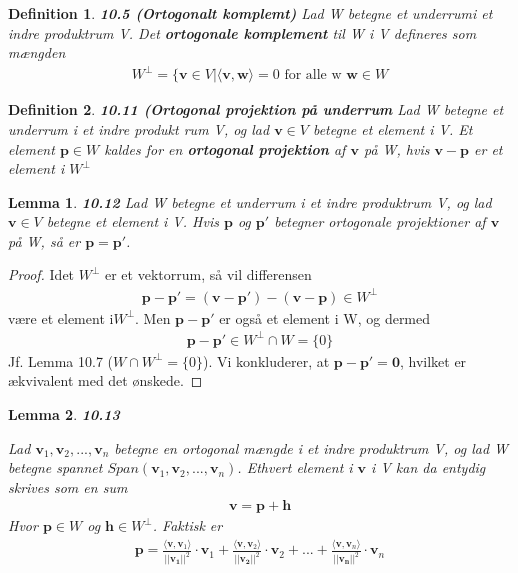 \documentclass[paper=a4, fontsize=11pt]{scrartcl} %
\newtheorem*{lemma}{Lemma}
\newtheorem*{definition}{Definition}
\newenvironment{cstmlemma}[1]{\begin{lemma} {\normalfont\textbf{#1}}}{\end{lemma}}
\newenvironment{cstmdefinition}[1]{\begin{definition} {\normalfont\textbf{#1}}}{\end{definition}}
\begin{document}
		\begin{cstmdefinition}{10.5 (Ortogonalt komplemt)}
			Lad W betegne et underrumi et indre produktrum V. Det \textbf{ortogonale komplement} til W i V defineres som mængden
			\begin{align*}
			W^\bot =\{\mathbf{v}\in V|\langle\mathbf{v},\mathbf{w}\rangle=0 \text{ for alle w } \mathbf{w}\in W
			\end{align*}
			
		\end{cstmdefinition}
		
		\begin{cstmdefinition}{10.11 (Ortogonal projektion på underrum}
			Lad W betegne et underrum i et indre produkt rum V, og lad $\mathbf{v}\in V$ betegne et element i V. Et element $\mathbf{p}\in W$ kaldes for en \textbf{ortogonal projektion} af $\mathbf{v}$ på W, hvis $\mathbf{v}-\mathbf{p}$ er et element i $W^\bot$
			
		\end{cstmdefinition}
		
		\begin{cstmlemma}{10.12}
			Lad W betegne et underrum i et indre produktrum V, og lad $\mathbf{v}\in V$ betegne et element i V. Hvis $\mathbf{p}$ og $\mathbf{p}'$ betegner ortogonale projektioner af $\mathbf{v}$ på W, så er $\mathbf{p}=\mathbf{p}'$.
		\end{cstmlemma}
		
		\begin{proof}
			Idet $W^\bot$ er et vektorrum, så vil differensen
			\begin{align*}
			\mathbf{p}-\mathbf{p}' =(\mathbf{v}-\mathbf{p}')-(\mathbf{v}-\mathbf{p})\in W^\bot
			\end{align*}
			være et element i$W^\bot$. Men $\mathbf{p}-\mathbf{p}'$ er også et element i W, og dermed
			\begin{align*}
			\mathbf{p}-\mathbf{p}'\in W^\bot \cap W=\{0\}
			\end{align*}
			Jf. Lemma 10.7 ($W\cap W^\bot =\{0\}$). Vi konkluderer, at $\mathbf{p}-\mathbf{p}'=\mathbf{0}$, hvilket er ækvivalent med det ønskede.
		\end{proof}
		
		\begin{cstmlemma}{10.13}
			
			Lad $\mathbf{v}_1,\mathbf{v}_2,...,\mathbf{v}_n$ betegne en ortogonal mængde i et indre produktrum V, og lad W betegne spannet $Span(\mathbf{v}_1,\mathbf{v}_2,...,\mathbf{v}_n)$. Ethvert element i $\mathbf{v}$ i V kan da entydig skrives som en sum
			\begin{align*}
			\mathbf{v}=\mathbf{p}+\mathbf{h}
			\end{align*}
			Hvor $\mathbf{p}\in W$ og $\mathbf{h}\in W^\bot$. Faktisk er 
			\begin{align*}
			\mathbf{p}=\frac{\langle\mathbf{v},\mathbf{v}_1\rangle}{||\mathbf{v_1}||^2}\cdot\mathbf{v}_1+\frac{\langle\mathbf{v},\mathbf{v}_2\rangle}{||\mathbf{v_2}||^2}\cdot\mathbf{v}_2+...+\frac{\langle\mathbf{v},\mathbf{v}_n\rangle}{||\mathbf{v_n}||^2}\cdot\mathbf{v}_n
			\end{align*}
		\end{cstmlemma}
		
\end{document}
